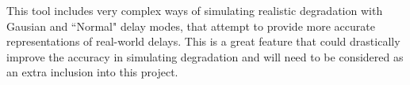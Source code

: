 This tool includes very complex ways of simulating realistic degradation with Gausian and ``Normal" delay modes, that attempt to provide more accurate representations of real-world delays. This is a great feature that could drastically improve the accuracy in simulating degradation and will need to be considered as an extra inclusion into this project.





%

